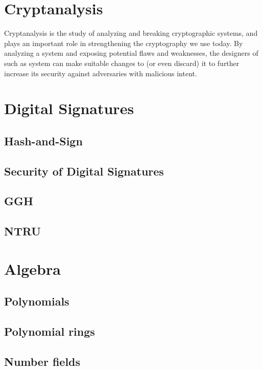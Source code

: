 \section{Cryptanalysis}
Cryptanalysis is the study of analyzing and breaking cryptographic systems, and plays an important role in strengthening the cryptography we use today.
By analyzing a system and exposing potential flaws and weaknesses, the designers of such as system can make suitable changes to (or even discard) it to further increase its security against adversaries with malicious intent.

\section{Digital Signatures}
\subsection{Hash-and-Sign}
\subsection{Security of Digital Signatures}
\subsection{GGH}
\subsection{NTRU}

\section{Algebra}
\subsection{Polynomials}
\subsection{Polynomial rings}
\subsection{Number fields}

